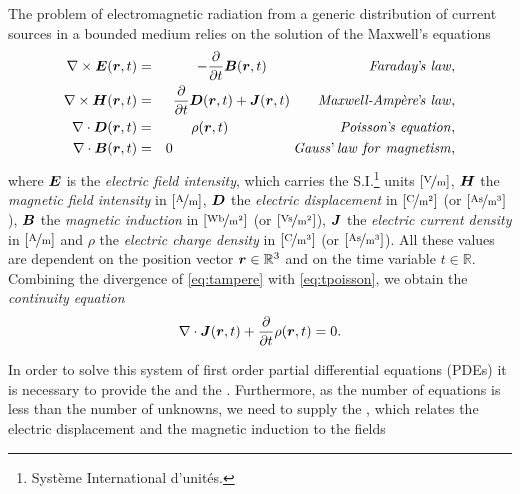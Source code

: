 \par The problem of electromagnetic radiation from a generic distribution of current sources in a bounded medium relies on the solution of the Maxwell's equations \cite{RothwellCloudE}
\begin{eqnarray}
\nabla \times \mbfit{E}(\mbfit{r},t) &= & -\frac{\partial}{\partial t}\mbfit{B}(\mbfit{r},t) \qquad \qquad \qquad \ \ \ \ \mathit{Faraday}\textrm{'}\mathit{\!s \ law}, \label{eq:tfaraday}  \\
\nabla \times \mbfit{H}(\mbfit{r},t) &= & \frac{\partial}{\partial t}\mbfit{D}(\mbfit{r},t) + \mbfit{J}(\mbfit{r},t)  \qquad \textit{Maxwell-Amp\`{e}re}\textrm{'}\mathit{\!s \ law}, \label{eq:tampere} \\
\nabla \cdot \mbfit{D}(\mbfit{r},t) &= & \rho(\mbfit{r},t) \qquad \qquad \qquad \qquad  \mathit{Poisson}\textrm{'}\mathit{\!s \ equation}, \label{eq:tpoisson}\\
\nabla \cdot \mbfit{B}(\mbfit{r},t) &= & 0 \qquad \qquad \qquad \qquad \ \ \mathit{Gauss}\textrm{'}\mathit{\! \ law \ for \ magnetism}, \label{eq:tgauss}
\end{eqnarray} where $\mbfit{E}$ is the \textit{electric field intensity}, which carries the S.I.\footnote{Syst\`eme International d'unit\'es.} units $\mathrm{[\nicefrac{\mathrm{V}}{m}]}$, $\mbfit{H}$ the \textit{magnetic field intensity} in $\mathrm{[\nicefrac{\mathrm{A}}{m}]}$, $\mbfit{D}$ the \textit{electric displacement} in $\mathrm{[\nicefrac{\mathrm{C}}{m^2}]}$ (or $\mathrm{[\nicefrac{\mathrm{As}}{m^3}]}$), $\mbfit{B}$ the \textit{magnetic induction} in $\mathrm{[\nicefrac{\mathrm{Wb}}{m^2}]}$ (or $\mathrm{[\nicefrac{\mathrm{Vs}}{m^2}]}$), $\mbfit{J}$ the \textit{electric current density} in $\mathrm{[\nicefrac{\mathrm{A}}{m}]}$ and $\rho$ the \textit{electric charge density} in $\mathrm{[\nicefrac{\mathrm{C}}{m^3}]}$ (or $\mathrm{[\nicefrac{\mathrm{As}}{m^3}]}$).
 All these values are dependent on the position vector $\mbfit{r} \in \mathbb{R}^3$ and on the time variable $t \in \mathbb{R}$. Combining the divergence of \eqref{eq:tampere} with \eqref{eq:tpoisson}, we obtain the \textit{continuity equation}
\begin{equation}
\nabla \cdot \mbfit{J}(\mbfit{r},t) + \frac{\partial}{\partial t} \rho(\mbfit{r},t) = 0.
\end{equation}
\par In order to solve this system of first order partial differential equations (PDEs) it is necessary to provide the  and the . Furthermore, as the number of equations is less than the number of unknowns, we need to supply the , which relates the electric displacement and the magnetic induction to the fields
